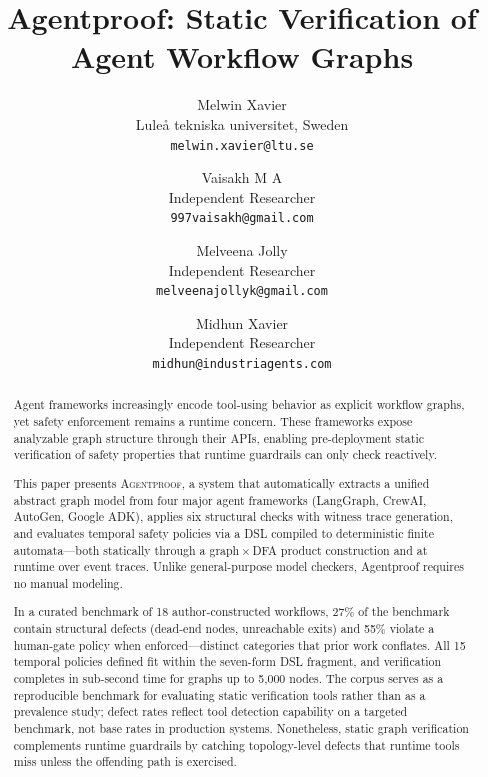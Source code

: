 \documentclass[11pt]{article}
\title{Agentproof: Static Verification of Agent Workflow Graphs}
\author{
  Melwin Xavier \\
  Lule\aa{} tekniska universitet, Sweden \\
  \texttt{melwin.xavier@ltu.se}
  \and
  Vaisakh M A \\
  Independent Researcher \\
  \texttt{997vaisakh@gmail.com}
  \and
  Melveena Jolly \\
  Independent Researcher \\
  \texttt{melveenajollyk@gmail.com}
  \and
  Midhun Xavier \\
  Independent Researcher \\
  \texttt{midhun@industriagents.com}
}
\date{}
\begin{document}
\maketitle

\begin{abstract}
Agent frameworks increasingly encode tool-using behavior as explicit
workflow graphs, yet safety enforcement remains a runtime concern.
These frameworks expose analyzable graph structure
through their APIs, enabling pre-deployment static verification of
safety properties that runtime guardrails can only check reactively.

This paper presents \textsc{Agentproof}, a system that automatically extracts a
unified abstract graph model from four major agent frameworks
(LangGraph, CrewAI, AutoGen, Google ADK), applies six structural
checks with witness trace generation, and evaluates temporal safety
policies via a DSL compiled to deterministic finite automata---both
statically through a graph\,$\times$\,DFA product construction and at
runtime over event traces. Unlike
general-purpose model checkers, Agentproof requires no manual modeling.

In a curated benchmark of 18 author-constructed workflows, 27\% of the
benchmark contain structural defects (dead-end nodes, unreachable exits)
and 55\% violate a human-gate policy when enforced---distinct categories
that prior work conflates. All 15 temporal policies defined fit within
the seven-form DSL fragment, and verification completes in sub-second
time for graphs up to 5{,}000 nodes. The corpus serves as a reproducible
benchmark for evaluating static verification tools rather than as a
prevalence study; defect rates reflect tool detection capability on a
targeted benchmark, not base rates in production systems. Nonetheless,
static graph verification complements runtime guardrails by catching
topology-level defects that runtime tools miss unless the offending path
is exercised.
\end{abstract}
















\appendix


\end{document}

